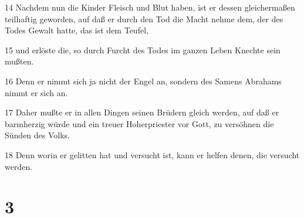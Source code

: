 \par 14 Nachdem nun die Kinder Fleisch und Blut haben, ist er dessen gleichermaßen teilhaftig geworden, auf daß er durch den Tod die Macht nehme dem, der des Todes Gewalt hatte, das ist dem Teufel,
\par 15 und erlöste die, so durch Furcht des Todes im ganzen Leben Knechte sein mußten.
\par 16 Denn er nimmt sich ja nicht der Engel an, sondern des Samens Abrahams nimmt er sich an.
\par 17 Daher mußte er in allen Dingen seinen Brüdern gleich werden, auf daß er barmherzig würde und ein treuer Hoherpriester vor Gott, zu versöhnen die Sünden des Volks.
\par 18 Denn worin er gelitten hat und versucht ist, kann er helfen denen, die versucht werden.

\chapter{3}

